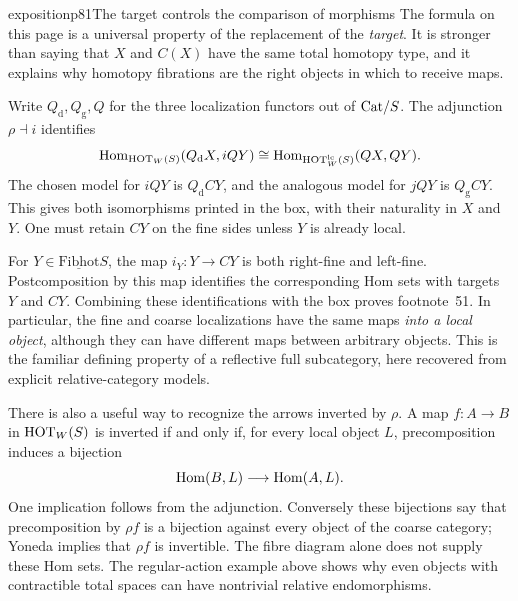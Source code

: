 \begin{dcomment}{exposition}{p81}{The target controls the comparison of morphisms}
The formula on this page is a universal property of the replacement of the \emph{target}. It is stronger than saying that $X$ and $C(X)$ have the same total homotopy type, and it explains why homotopy fibrations are the right objects in which to receive maps.

Write $Q_{\mathrm d},Q_{\mathrm g},Q$ for the three localization functors out of $\mathrm{Cat}/S$. The adjunction $\rho\dashv i$ identifies
\[
 \operatorname{Hom}_{\mathrm{HOT}_W(S)}(Q_{\mathrm d}X,iQY)
       \cong\operatorname{Hom}_{\mathrm{HOT}_W^{\mathrm{lc}}(S)}(QX,QY).
\]
The chosen model for $iQY$ is $Q_{\mathrm d}CY$, and the analogous model for $jQY$ is $Q_{\mathrm g}CY$. This gives both isomorphisms printed in the box, with their naturality in $X$ and $Y$. One must retain $CY$ on the fine sides unless $Y$ is already local.

For $Y\in\underline{\mathrm{Fibhot}}S$, the map $i_Y:Y\to CY$ is both right-fine and left-fine. Postcomposition by this map identifies the corresponding Hom sets with targets $Y$ and $CY$. Combining these identifications with the box proves footnote~51. In particular, the fine and coarse localizations have the same maps \emph{into a local object}, although they can have different maps between arbitrary objects. This is the familiar defining property of a reflective full subcategory, here recovered from explicit relative-category models.

There is also a useful way to recognize the arrows inverted by $\rho$. A map $f:A\to B$ in $\mathrm{HOT}_W(S)$ is inverted if and only if, for every local object $L$, precomposition induces a bijection
\[
 \operatorname{Hom}(B,L)\longrightarrow\operatorname{Hom}(A,L).
\]
One implication follows from the adjunction. Conversely these bijections say that precomposition by $\rho f$ is a bijection against every object of the coarse category; Yoneda implies that $\rho f$ is invertible. The fibre diagram alone does not supply these Hom sets. The regular-action example above shows why even objects with contractible total spaces can have nontrivial relative endomorphisms.
\end{dcomment}


